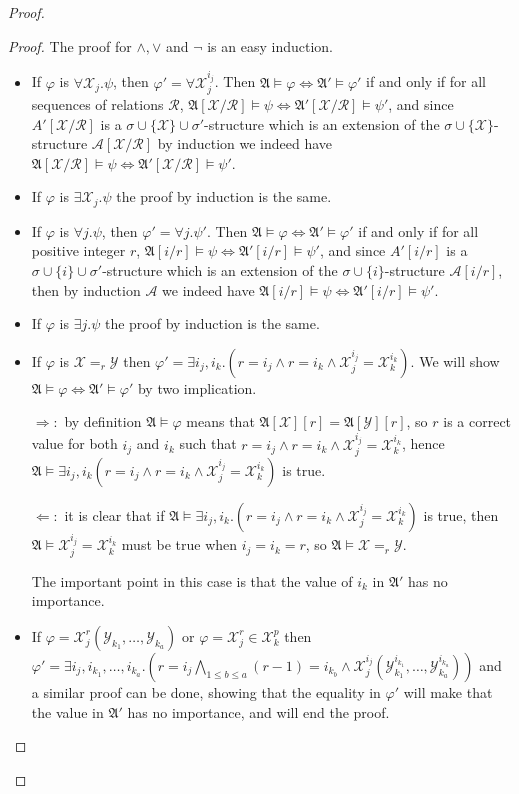 \documentclass[a4paper,12pt]{article}
\theoremstyle{definition}
\renewcommand{\phi}{\varphi}
\newcommand{\mc}{\mathcal}
\newcommand{\mf}{\mathfrak}
\begin{document}
\begin{proof}
\begin{proof}
  The proof for $\land,\lor$ and $\neg$ is an easy induction.
  \begin{itemize}
  \item If $\phi$ is $\forall \mc X_j.\psi$, then $\phi'=\forall \mc
    X_j^{i_j}$.  Then $\mf A\models \phi\Leftrightarrow \mf
    A'\models\phi'$ if and only if for all sequences of relations $\mc
    R$, $\mf A[\mc X/\mc R]\models \psi\Leftrightarrow \mf A'[\mc
    X/\mc R]\models\psi'$, and since $A'[\mc X/\mc R]$ is a
    $\sigma\cup\{\mc X\}\cup \sigma'$-structure which is an extension
    of the $\sigma\cup\{\mc X\}$-structure $\mc A[\mc X/\mc R]$ by
    induction we indeed have $\mf A[\mc X/\mc R]\models
    \psi\Leftrightarrow \mf A'[\mc X/\mc R]\models\psi'$.
  \item If $\phi$ is $\exists \mc X_j.\psi$ the proof by induction is the
    same.
  \item If $\phi$ is $\forall j.\psi$, then $\phi'=\forall
    j.\psi'$. Then $\mf A\models \phi\Leftrightarrow \mf
    A'\models\phi'$ if and only if for all positive integer $r$, $\mf
    A[i/r]\models \psi\Leftrightarrow \mf A'[i/r]\models\psi'$, and
    since $A'[i/r]$ is a $\sigma\cup\{i\}\cup \sigma'$-structure which
    is an extension of the $\sigma\cup\{i\}$-structure $\mc A[i/r]$,
    then by induction $\mc A$ we indeed have $\mf A[i/r]\models
    \psi\Leftrightarrow \mf A'[i/r]\models\psi'$.
  \item If $\phi$ is $\exists j.\psi$ the proof by induction is the
    same.
  \item If $\phi$ is $\mc X=_r\mc Y$ then $\phi'=\exists
    i_j,i_k.(r=i_j\land r=i_k\land \mc X_j^{i_j}=\mc X_k^{i_k})$. We
    will show $\mf A\models \phi\Leftrightarrow \mf A'\models\phi'$ by
    two implication.

    $\Rightarrow:$ by definition $\mf A\models \phi$ means that $\mf
    A[\mc X][r]=\mf A[\mc Y][r]$, so $r$ is a correct value for both
    $i_j$ and $i_k$ such that $r=i_j\land r=i_k\land \mc X_j^{i_j}=\mc
    X_k^{i_k}$, hence $\mf A\models\exists i_j,i_k(r=i_j\land
    r=i_k\land \mc X_j^{i_j}=\mc X_k^{i_k})$ is true.

    $\Leftarrow:$ it is clear that if $\mf A\models\exists
    i_j,i_k.(r=i_j\land r=i_k\land \mc X_j^{i_j}=\mc X_k^{i_k})$ is
    true, then $\mf A\models\mc X_j^{i_j}=\mc X_k^{i_k}$ must be true
    when $i_j=i_k=r$, so $\mf A\models \mc X=_r\mc Y$.

    The important point in this case is that the value of $i_k$ in
    $\mf A'$ has no importance.
  \item If $\phi=\mc X_j^r(\mathcal Y_{k_1},\dots,\mathcal Y_{k_a})$
    or $\phi=\mc X_j^r\in \mc X_k^p$ then $\phi'=\exists
    i_j,i_{k_1},\dots,i_{k_a}.(r=i_j\bigwedge_{1\le b\le a}
    (r-1)=i_{k_b}\land \mc X_j^{i_j}(\mathcal
    Y_{k_1}^{i_{k_1}},\dots,\mathcal Y_{k_a}^{i_{k_a}}))$ and a
    similar proof can be done, showing that the equality in $\phi'$
    will make that the value in $\mf A'$ has no importance, and will
    end the proof.
  \end{itemize}
\end{proof}
\end{proof}
\end{document}
